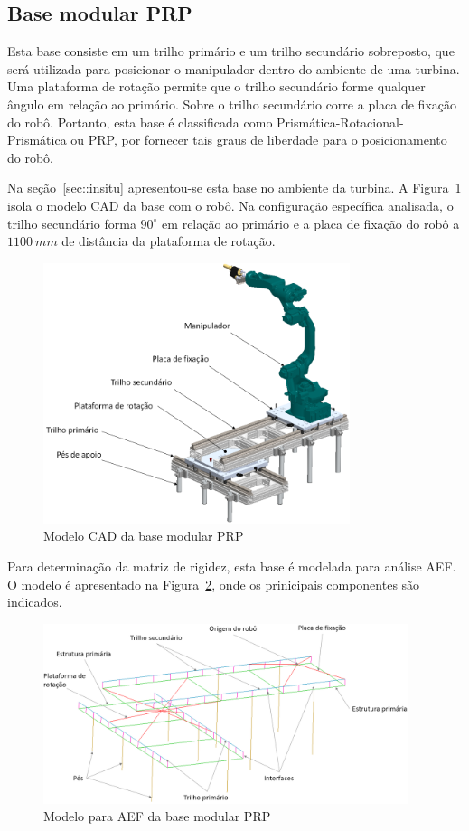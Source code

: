 \subsection{Base modular PRP}

Esta base consiste em um trilho primário e um trilho secundário sobreposto, que
será utilizada para posicionar o manipulador dentro do ambiente de uma turbina.
Uma plataforma de rotação permite que o trilho secundário forme qualquer ângulo
em relação ao primário. Sobre o trilho secundário corre a placa de fixação do
robô. Portanto, esta base é classificada como Prismática-Rotacional-Prismática
ou PRP, por fornecer tais graus de liberdade para o posicionamento do robô.

Na seção~\ref{sec::insitu} apresentou-se esta base no ambiente da turbina.
A Figura~\ref{fig::prp_cad} isola o modelo CAD da base com o robô. Na
configuração específica analisada, o trilho secundário forma $90^\circ$
em relação ao primário e a placa de fixação do robô a $1100~mm$ de distância da
plataforma de rotação.

\begin{figure}[h]
	\centering 
 	\includegraphics[width=0.80\textwidth]{figs/prp_cad}
 	\caption{Modelo CAD da base modular PRP}
 	\label{fig::prp_cad}
\end{figure}

Para determinação da matriz de rigidez, esta base é modelada para análise AEF. O
modelo é apresentado na Figura~\ref{fig::prp_fea}, onde os prinicipais
componentes são indicados.

\begin{figure}[h]
	\centering 
 	\includegraphics[width=0.95\textwidth]{figs/prp_fea}
 	\caption{Modelo para AEF da base modular PRP}
 	\label{fig::prp_fea}
\end{figure}

